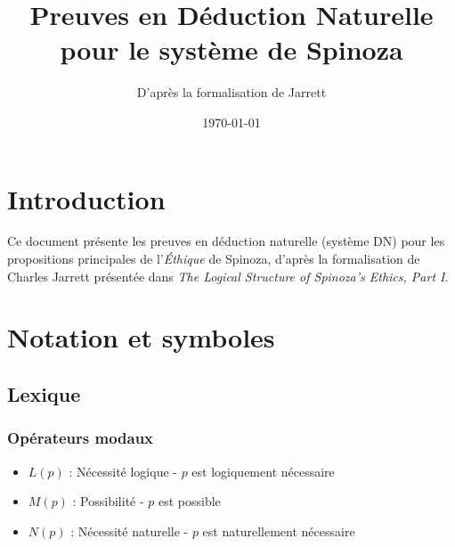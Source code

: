 \documentclass[11pt,a4paper]{article}
\title{Preuves en Déduction Naturelle pour le système de Spinoza}
\author{D'après la formalisation de Jarrett}
\date{\today}
\begin{document}
\maketitle

\section{Introduction}

Ce document présente les preuves en déduction naturelle (système DN) pour les propositions principales de l'\textit{Éthique} de Spinoza, d'après la formalisation de Charles Jarrett présentée dans \textit{The Logical Structure of Spinoza's Ethics, Part I}.

\section{Notation et symboles}

\subsection{Lexique}

\subsubsection{Opérateurs modaux}
\begin{itemize}
    \item $L(p)$ : Nécessité logique - $p$ est logiquement nécessaire
    \item $M(p)$ : Possibilité - $p$ est possible
    \item $N(p)$ : Nécessité naturelle - $p$ est naturellement nécessaire
\end{itemize}
\end{document}

